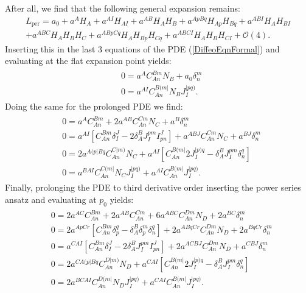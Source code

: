 After all, we find that the following general expansion remains: 
\begin{multline}\label{LperRed}
     L_{\text{per}} = a_0 + a^A H_A + a^{AI}H_{AI} + a^{AB} H_{A}H_{B} + a^{ApBq} H_{Ap}H_{Bq} + a^{ABI} H_{A} H_{BI} \\
    + a^{ABC} H_A H_B H_C + a^{ABpCq} H_{A}H_{Bp}H_{Cq}
    + a^{ABCI} H_A H_B H_{CI} 
    + \mathcal{O}(4).
\end{multline}
Inserting this in the last 3 equations of the PDE (\ref{DiffeoEqnFormal}) and evaluating at the flat expansion point yields:
\begin{align}\label{order1}
    \begin{aligned}
    &0 = a^A C_{An}^{Bm}N_B + a_0 \delta^m_n\\
    &0 = a^{AI}C_{An}^{B(m\vert }N_B J^{\vert pq)}_I.
    \end{aligned}
\end{align}
Doing the same for the prolonged PDE we find: 
\begin{align}\label{order2}
    \begin{aligned}
    &0 = a^A C_{An}^{Bm} + 2 a^{AB}C_{An}^{Cm}N_C + a^B\delta^m_n\\
    &0 = a^{AI}\left [C_{An}^{Bm}\delta^J _I- 2 \delta^B_A J_I^{pm}I^J_{pn} \right ] + a^{ABJ}C_{An}^{Cm}N_C + a^{BJ} \delta^m_n \\
    &0 = 2a^{A(p\vert Bq}C_{An}^{C\vert m)}N_C + a^{AI} \left [C_{An}^{B(m\vert} 2 J_{I}^{\vert p)q} - \delta_A^BJ_I^{pm}\delta^q_n \right ]\\
    &0 = a^{BAI}C_{An}^{C(m\vert}N_CJ_I^{\vert pq)} + a^{AI}C_{An}^{B(m \vert} J_I^{\vert pq)}.
    \end{aligned}
\end{align}
Finally, prolonging the PDE to third derivative order inserting the power series ansatz and evaluating at $p_0$ yields:
\begin{align}\label{order3}
\begin{aligned}
&0 = 2 a^{AC}C_{An}^{Bm} + 2a^{AB}C_{An}^{Cm} + 6 a^{ABC}C_{An}^{Dm} N_D + 2a^{BC} \delta^m_n\\
&0 = 2 a^{ApCr} \left [ C_{An}^{Bm} \delta ^q_p - \delta^B_A \delta^m_p \delta^q_n \right ] +2 a^{A Bq Cr} C_{An}^{Dm} N_D + 2 a^{BqCr} \delta^m_n\\
&0 = a^{CAI} \left [C_{An}^{Bm}\delta^J _I- 2 \delta^B_A J_I^{pm}I^J_{pn} \right ] + 2 a^{ACBJ} C_{An}^{Dm} N_D + a^{CBJ} \delta ^m _n \\
&0 = 2 a^{C A(p \vert B q} C_{An}^{D \vert m )} N_D + a^{CAI} \left [C_{An}^{B(m\vert} 2 J_{I}^{\vert p)q} - \delta_A^BJ_I^{pm}\delta^q_n \right ]\\
&0 = 2 a^{BCAI}C_{An}^{D(m\vert}N_DJ_I^{\vert pq)} + a^{CAI}C_{An}^{B(m \vert} J_I^{\vert pq)}.
\end{aligned}
\end{align}
